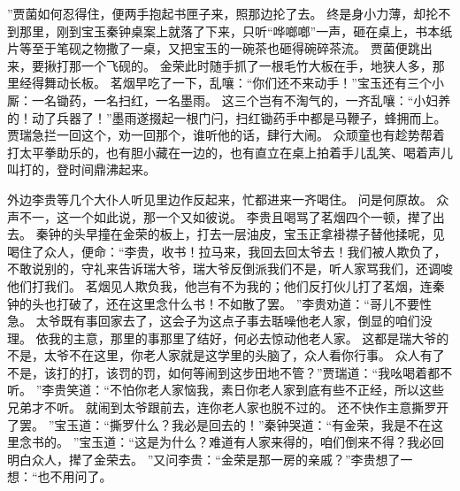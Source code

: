 ”贾菌如何忍得住，便两手抱起书匣子来，照那边抡了去。
终是身小力薄，却抡不到那里，刚到宝玉秦钟桌案上就落了下来，只听“哗啷啷”一声，砸在桌上，书本纸片等至于笔砚之物撒了一桌，又把宝玉的一碗茶也砸得碗碎茶流。
贾菌便跳出来，要揪打那一个飞砚的。
金荣此时随手抓了一根毛竹大板在手，地狭人多，那里经得舞动长板。
茗烟早吃了一下，乱嚷：“你们还不来动手！”宝玉还有三个小厮：一名锄药，一名扫红，一名墨雨。
这三个岂有不淘气的，一齐乱嚷：“小妇养的！动了兵器了！”墨雨遂掇起一根门闩，扫红锄药手中都是马鞭子，蜂拥而上。
贾瑞急拦一回这个，劝一回那个，谁听他的话，肆行大闹。
众顽童也有趁势帮着打太平拳助乐的，也有胆小藏在一边的，也有直立在桌上拍着手儿乱笑、喝着声儿叫打的，登时间鼎沸起来。
\par
外边李贵等几个大仆人听见里边作反起来，忙都进来一齐喝住。
问是何原故。
众声不一，这一个如此说，那一个又如彼说。
李贵且喝骂了茗烟四个一顿，撵了出去。
秦钟的头早撞在金荣的板上，打去一层油皮，宝玉正拿褂襟子替他揉呢，见喝住了众人，便命：“李贵，收书！拉马来，我回去回太爷去！我们被人欺负了，不敢说别的，守礼来告诉瑞大爷，瑞大爷反倒派我们不是，听人家骂我们，还调唆他们打我们。
茗烟见人欺负我，他岂有不为我的；他们反打伙儿打了茗烟，连秦钟的头也打破了，还在这里念什么书！不如散了罢。
”李贵劝道：“哥儿不要性急。
太爷既有事回家去了，这会子为这点子事去聒噪他老人家，倒显的咱们没理。
依我的主意，那里的事那里了结好，何必去惊动他老人家。
这都是瑞大爷的不是，太爷不在这里，你老人家就是这学里的头脑了，众人看你行事。
众人有了不是，该打的打，该罚的罚，如何等闹到这步田地不管？”贾瑞道：“我吆喝着都不听。
”李贵笑道：“不怕你老人家恼我，素日你老人家到底有些不正经，所以这些兄弟才不听。
就闹到太爷跟前去，连你老人家也脱不过的。
还不快作主意撕罗开了罢。
”宝玉道：“撕罗什么？我必是回去的！”秦钟哭道：“有金荣，我是不在这里念书的。
”宝玉道：“这是为什么？难道有人家来得的，咱们倒来不得？我必回明白众人，撵了金荣去。
”又问李贵：“金荣是那一房的亲戚？”李贵想了一想：“也不用问了。
